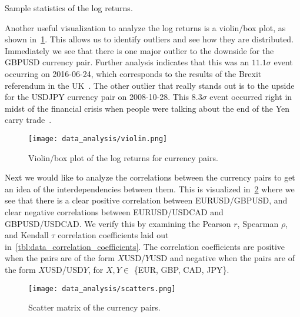 \begin{table}[!htb]
    \centering
    \begin{adjustbox}{max width=\textwidth}
        
    \end{adjustbox}
    \caption{Sample statistics of the log returns.}
    \label{tbl:data_log_returns_raw_stats}
\end{table}

Another useful visualization to analyze the log returns is a violin/box plot, as shown in~\cref{fig:violin_raw}.
This allows us to identify outliers and see how they are distributed.
Immediately we see that there is one major outlier to the downside for the GBPUSD currency pair.
Further analysis indicates that this was an \( 11.1\sigma \) event occurring on 2016-06-24, which corresponds to the results of the Brexit referendum in the UK~\cite{brexit_gov_uk}.
The other outlier that really stands out is to the upside for the USDJPY currency pair on 2008-10-28.
This \( 8.3\sigma \) event occurred right in midst of the financial crisis when people were talking about the end of the Yen carry trade~\cite{jpy_carry_trade_nyt}.
\begin{figure}[!htb]
    \begin{center}
        \texttt{[image: data\_analysis/violin.png]}
    \end{center}
    \caption{Violin/box plot of the log returns for currency pairs.}
    \label{fig:violin_raw}
\end{figure}

Next we would like to analyze the correlations between the currency pairs to get an idea of the interdependencies between them.
This is visualized in~\cref{fig:scatters} where we see that there is a clear positive correlation between EURUSD/GBPUSD, and clear negative correlations between EURUSD/USDCAD and GBPUSD/USDCAD.
We verify this by examining the Pearson \( r \), Spearman \( \rho \), and Kendall \( \tau \) correlation coefficients laid out in~\cref{tbl:data_correlation_coefficients}.
The correlation coefficients are positive when the pairs are of the form \( X \)USD/\( Y \)USD and negative when the pairs are of the form \( X \)USD/USD\( Y \), for \( X,Y \in \) \{EUR, GBP, CAD, JPY\}.
\begin{figure}[!htb]
    \begin{center}
        \texttt{[image: data\_analysis/scatters.png]}
    \end{center}
    \caption{Scatter matrix of the currency pairs.}
    \label{fig:scatters}
\end{figure}

